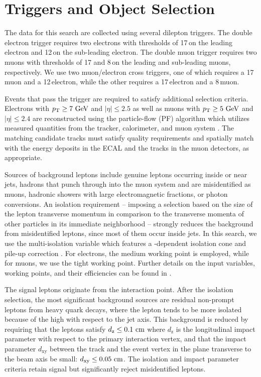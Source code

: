 \chapter{Triggers and Object Selection}
\label{sec:ObjectID}

The data for this search are collected using several dilepton triggers. The double electron trigger requires two electrons with \pt thresholds of 17\,\GeV on the leading electron and 12\,\GeV on the sub-leading electron. The double muon trigger requires two muons with \pt thresholds of 17 and 8\,\GeV on the leading and sub-leading muons, respectively. We use two muon/electron cross triggers, one of which requires a 17\,\GeV muon and a 12\,\GeV electron, while the other requires a 17\,\GeV electron and a 8\,\GeV muon.

Events that pass the trigger are required to satisfy additional selection criteria. Electrons with $p_{\mathrm{T}} \geq 7\,\,\text{Ge\hspace{-.08em}V}$ and $|\eta| \leq 2.5$ as well as muons with $p_{\mathrm{T}} \geq 5\,\,\text{Ge\hspace{-.08em}V}$ and $|\eta| \leq 2.4$ are reconstructed using the particle-flow (PF) algorithm which utilizes measured quantities from the tracker, calorimeter, and muon system \cite{CMS-PAS-PFT-09-001}. The matching candidate tracks must satisfy quality requirements and spatially match with the energy deposits in the ECAL and the tracks in the muon detectors, as appropriate.

Sources of background leptons include genuine leptons occurring inside or near jets, hadrons that punch through into the muon system and are misidentified as muons, hadronic showers with large electromagnetic fractions, or photon conversions. An isolation requirement -- imposing a selection based on the size of the lepton transverse momentum in comparison to the transverse momenta of other particles in its immediate neighborhood -- strongly reduces the background from misidentified leptons, since most of them occur inside jets. In this search, we use the multi-isolation variable which features a \pt-dependent isolation cone and pile-up correction \cite{CMS-PAS-SUS-15-008}. For electrons, the medium working point is employed, while for muons, we use the tight working point. Further details on the input variables, working points, and their efficiencies can be found in \cite{CMS-PAS-SUS-15-008}.

The signal leptons originate from the interaction point. After the isolation selection, the most significant background sources are residual non-prompt leptons from heavy quark decays, where the lepton tends to be more isolated because of the high \pt with respect to the jet axis. This background is reduced by requiring that the leptons satisfy $d_\textrm{z} \leq 0.1\,\,\text{cm}$ where $d_\textrm{z}$ is the longitudinal impact parameter with respect to the primary interaction vertex, and that the impact parameter $d_\textrm{xy}$ between the track and the event vertex in the plane transverse to the beam axis be small: $d_\textrm{xy} \leq 0.05\,\,\text{cm}$. The isolation and impact parameter criteria retain signal but significantly reject misidentified leptons.

